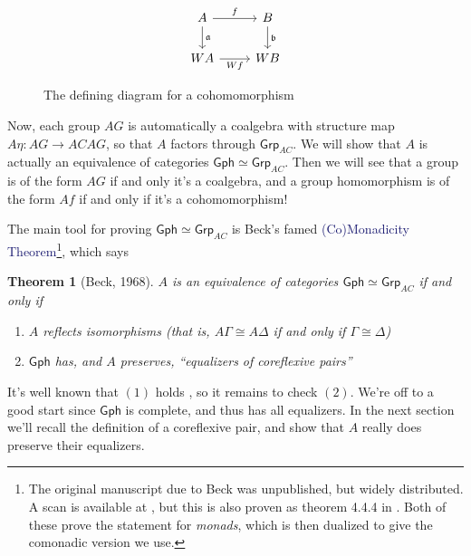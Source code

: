 \documentclass[12pt]{article}
\newtheorem{thm}{Theorem}
\theoremstyle{definition}
\theoremstyle{theorem}
\newcommand*{\catFont}[1]{\mathsf{#1}}
\newcommand{\Grp}{\catFont{Grp}}
\newcommand*{\important}[1]{\textcolor{MidnightBlue}{#1}}
\begin{document}
\begin{figure}
    \label{fig:cohom}
    \[
        \begin{tikzcd}
        A & B \\
        WA & WB
        \arrow["\mathfrak{a}", from=1-1, to=2-1]
        \arrow["\mathfrak{b}", from=1-2, to=2-2]
        \arrow["f", from=1-1, to=1-2]
        \arrow["Wf"', from=2-1, to=2-2]
        \end{tikzcd}
    \]    
    \caption{The defining diagram for a cohomomorphism}
\end{figure}

Now, each group $AG$ is automatically a coalgebra with structure map
$A \eta : AG \to ACAG$, so that $A$ factors through $\Grp_{AC}$.
We will show that $A$ is actually an equivalence of categories 
$\mathsf{Gph} \simeq \Grp_{AC}$. Then we will see that a group is of the
form $AG$ if and only it's a coalgebra, and a group homomorphism is of the
form $Af$ if and only if it's a cohomomorphism!

The main tool for proving $\mathsf{Gph} \simeq \Grp_{AC}$ is Beck's famed
\important{(Co)Monadicity Theorem}\footnote{The original manuscript due to Beck 
was unpublished, but widely distributed. A scan is available at
\cite{beckBeckMonadicityTheoremPdf}, but this is also proven as
theorem 4.4.4 in \cite{borceuxCategoriesStructures1994}. Both of 
these prove the statement for \emph{monads}, which is then dualized to give
the comonadic version we use.}, which says

\begin{thm}[Beck, 1968]
    $A$ is an equivalence of categories $\mathsf{Gph} \simeq \Grp_{AC}$ 
    if and only if

    \begin{enumerate}
        \item $A$ reflects isomorphisms (that is, $A\Gamma \cong A\Delta$ if and only if $\Gamma \cong \Delta$)
        \item $\mathsf{Gph}$ has, and $A$ preserves, ``equalizers of coreflexive pairs''
    \end{enumerate}
\end{thm}

It's well known that $(1)$ holds \cite{dromsIsomorphismsGraphGroups1987}, 
so it remains to check $(2)$. We're off to a good start since $\mathsf{Gph}$
is complete, and thus has all equalizers. In the next section we'll recall
the definition of a coreflexive pair, and show that $A$ really does 
preserve their equalizers.
\end{document}
